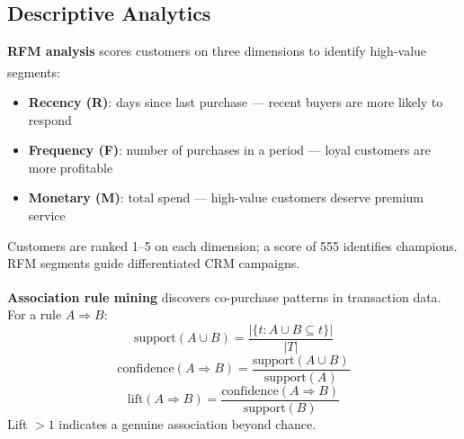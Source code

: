 \subsection{Descriptive Analytics}

\begin{tcbitemize}[ skin=sectionraster ]

    \tcbitem[title=RFM Customer Segmentation, raster multicolumn=3]
    \textbf{RFM analysis} scores customers on three dimensions to identify high-value segments\textsuperscript{\cite[][pp.~110--115]{chaffeyDigitalBusinessECommerce2019}}:
    \begin{itemize}
        \item \textbf{Recency (R)}: days since last purchase --- recent buyers are more likely to respond
        \item \textbf{Frequency (F)}: number of purchases in a period --- loyal customers are more profitable
        \item \textbf{Monetary (M)}: total spend --- high-value customers deserve premium service
    \end{itemize}
    Customers are ranked 1--5 on each dimension; a score of 555 identifies champions. RFM segments guide differentiated CRM campaigns.

    \tcbitem[title=Market Basket Analysis, raster multicolumn=3]
    \textbf{Association rule mining} discovers co-purchase patterns in transaction data\textsuperscript{\cite[][pp.~217--221]{leskovecMiningMassiveDatasets2014}}.
    For a rule $A \Rightarrow B$:
    \begin{equation}
        \text{support}(A \cup B) = \frac{|\{t : A \cup B \subseteq t\}|}{|T|}
    \end{equation}
    \begin{equation}
        \text{confidence}(A \Rightarrow B) = \frac{\text{support}(A \cup B)}{\text{support}(A)}
    \end{equation}
    \begin{equation}
        \text{lift}(A \Rightarrow B) = \frac{\text{confidence}(A \Rightarrow B)}{\text{support}(B)}
    \end{equation}
    Lift $> 1$ indicates a genuine association beyond chance.


\end{tcbitemize}

